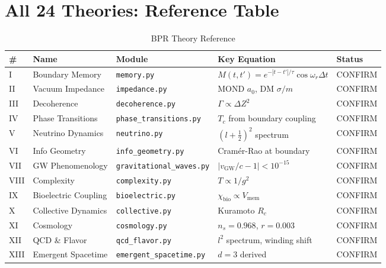\documentclass[12pt,oneside]{book}
\theoremstyle{definition}
\begin{document}
\appendix

\chapter{All 24 Theories: Reference Table}
\label{app:theories}

\begin{longtable}{@{}llp{3.2cm}p{5.5cm}l@{}}
  \caption{BPR Theory Reference}\\
  \toprule
  \textbf{\#} & \textbf{Name} & \textbf{Module} &
  \textbf{Key Equation} & \textbf{Status}\\
  \midrule\endfirsthead\midrule\endhead
  I   & Boundary Memory      & \texttt{memory.py}          & $M(t,t') = e^{-|t-t'|/\tau}\cos\omega_r\Delta t$ & CONFIRM\\
  II  & Vacuum Impedance     & \texttt{impedance.py}       & MOND $a_0$, DM $\sigma/m$           & CONFIRM\\
  III & Decoherence          & \texttt{decoherence.py}     & $\Gamma\propto\Delta Z^2$           & CONFIRM\\
  IV  & Phase Transitions    & \texttt{phase\_transitions.py}& $T_c$ from boundary coupling      & CONFIRM\\
  V   & Neutrino Dynamics    & \texttt{neutrino.py}        & $(l+\tfrac{1}{2})^2$ spectrum       & CONFIRM\\
  VI  & Info Geometry        & \texttt{info\_geometry.py}  & Cramér-Rao at boundary              & CONFIRM\\
  VII & GW Phenomenology     & \texttt{gravitational\_waves.py}& $|v_{\mathrm{GW}}/c - 1| < 10^{-15}$ & CONFIRM\\
  VIII& Complexity           & \texttt{complexity.py}      & $T \propto 1/g^2$                   & CONFIRM\\
  IX  & Bioelectric Coupling & \texttt{bioelectric.py}     & $\chi_{\mathrm{bio}}\propto V_{\mathrm{mem}}$ & CONFIRM\\
  X   & Collective Dynamics  & \texttt{collective.py}      & Kuramoto $R_c$                      & CONFIRM\\
  XI  & Cosmology            & \texttt{cosmology.py}       & $n_s=0.968$, $r=0.003$              & CONFIRM\\
  XII & QCD \& Flavor        & \texttt{qcd\_flavor.py}     & $l^2$ spectrum, winding shift       & CONFIRM\\
  XIII& Emergent Spacetime   & \texttt{emergent\_spacetime.py}& $d=3$ derived                    & CONFIRM\\

\end{longtable}
\end{document}
